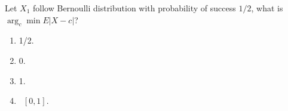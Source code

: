 \documentclass[poll_tutorial_format]{subfiles}
\begin{document}
	
	\begin{exercise}
		Let $X_1$ follow Bernoulli distribution with probability of success $1/2$, what is  $\arg_c \min E|X-c|$? %
		\begin{enumerate}
			\item 1/2.
			\item 0.  
			\item 1.
			\item ~$[0,1]$.
		\end{enumerate}
	\end{exercise}
	
	
	
 	
\end{document}
